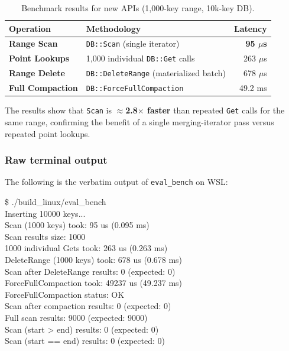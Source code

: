 \documentclass[11pt,a4paper]{article}
\newcommand{\fname}[1]{\textcolor{primary!85!black}{\texttt{#1}}}
\newcommand{\sym}[1]{\texttt{#1}}
\begin{document}
\begin{table}[htbp]
\centering
\caption{Benchmark results for new APIs (1,000-key range, 10k-key DB).}
\label{tab:bench}
\renewcommand{\arraystretch}{1.25}
\begin{tabularx}{0.85\linewidth}{@{}>{\bfseries\color{primary!85!black}}lXr@{}}
\toprule
Operation & Methodology & Latency \\
\midrule
Range Scan        & \fname{DB::Scan} (single iterator)            & \textbf{95 $\mu$s} \\
Point Lookups     & 1{,}000 individual \fname{DB::Get} calls       & 263 $\mu$s \\
Range Delete      & \fname{DB::DeleteRange} (materialized batch)   & 678 $\mu$s \\
Full Compaction   & \fname{DB::ForceFullCompaction}                & 49.2 ms \\
\bottomrule
\end{tabularx}
\end{table}

The results show that \sym{Scan} is \textbf{$\approx$2.8$\times$ faster} than
repeated \sym{Get} calls for the same range, confirming the benefit of a single
merging-iterator pass versus repeated point lookups.

\subsubsection*{Raw terminal output}

The following is the verbatim output of \fname{eval\_bench} on WSL:

\begin{tcolorbox}[colback=codebg, colframe=codeborder, colbacktitle=codeborder, boxrule=0.5pt, arc=2pt,
    left=8pt, right=8pt, top=6pt, bottom=6pt]
\ttfamily\footnotesize
\$ ./build\_linux/eval\_bench \\
Inserting 10000 keys... \\
Scan (1000 keys) took: 95 us (0.095 ms) \\
Scan results size: 1000 \\
1000 individual Gets took: 263 us (0.263 ms) \\
DeleteRange (1000 keys) took: 678 us (0.678 ms) \\
Scan after DeleteRange results: 0 (expected: 0)\;\textcolor{str}{\checkmark} \\
ForceFullCompaction took: 49237 us (49.237 ms) \\
ForceFullCompaction status: OK\;\textcolor{str}{\checkmark} \\
Scan after compaction results: 0 (expected: 0)\;\textcolor{str}{\checkmark} \\
Full scan results: 9000 (expected: 9000)\;\textcolor{str}{\checkmark} \\
Scan (start > end) results: 0 (expected: 0)\;\textcolor{str}{\checkmark} \\
Scan (start == end) results: 0 (expected: 0)\;\textcolor{str}{\checkmark}
\end{tcolorbox}
\end{document}
